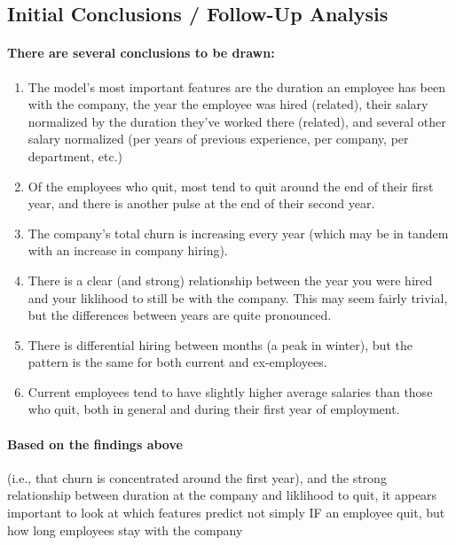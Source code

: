 \documentclass[11pt]{article}
\begin{document}
    \subsection{Initial Conclusions / Follow-Up
Analysis}\label{initial-conclusions-follow-up-analysis}

\paragraph{There are several conclusions to be
drawn:}\label{there-are-several-conclusions-to-be-drawn}

\begin{enumerate}
\def\labelenumi{(\arabic{enumi})}
\item
  The model's most important features are the duration an employee has
  been with the company, the year the employee was hired (related),
  their salary normalized by the duration they've worked there
  (related), and several other salary normalized (per years of previous
  experience, per company, per department, etc.)
\item
  Of the employees who quit, most tend to quit around the end of their
  first year, and there is another pulse at the end of their second
  year.
\item
  The company's total churn is increasing every year (which may be in
  tandem with an increase in company hiring).
\item
  There is a clear (and strong) relationship between the year you were
  hired and your liklihood to still be with the company. This may seem
  fairly trivial, but the differences between years are quite
  pronounced.
\item
  There is differential hiring between months (a peak in winter), but
  the pattern is the same for both current and ex-employees.
\item
  Current employees tend to have slightly higher average salaries than
  those who quit, both in general and during their first year of
  employment.
\end{enumerate}

\paragraph{Based on the findings
above}\label{based-on-the-findings-above}

(i.e., that churn is concentrated around the first year), and the strong
relationship between duration at the company and liklihood to quit, it
appears important to look at which features predict not simply IF an
employee quit, but how long employees stay with the company
\end{document}

